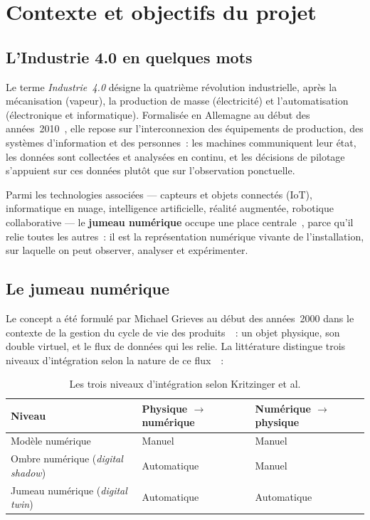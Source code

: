 \chapter{Contexte et objectifs du projet}
\label{chap:contexte}

\section{L'Industrie 4.0 en quelques mots}

Le terme \textit{Industrie~4.0} désigne la quatrième révolution industrielle, après la mécanisation (vapeur), la production de masse (électricité) et l'automatisation (électronique et informatique). Formalisée en Allemagne au début des années~2010~\cite{kagermann2013}, elle repose sur l'interconnexion des équipements de production, des systèmes d'information et des personnes~: les machines communiquent leur état, les données sont collectées et analysées en continu, et les décisions de pilotage s'appuient sur ces données plutôt que sur l'observation ponctuelle.

Parmi les technologies associées --- capteurs et objets connectés (\ac{IoT}), informatique en nuage, intelligence artificielle, réalité augmentée, robotique collaborative --- le \textbf{jumeau numérique} occupe une place centrale~\cite{tao2019}, parce qu'il relie toutes les autres~: il est la représentation numérique vivante de l'installation, sur laquelle on peut observer, analyser et expérimenter.

\section{Le jumeau numérique}

Le concept a été formulé par Michael Grieves au début des années~2000 dans le contexte de la gestion du cycle de vie des produits~\cite{grieves2014}~: un objet physique, son double virtuel, et le flux de données qui les relie. La littérature distingue trois niveaux d'intégration selon la nature de ce flux~\cite{kritzinger2018}~:

\begin{table}[H]
\centering
\caption{Les trois niveaux d'intégration selon Kritzinger et al.}
\label{tab:niveaux}
\begin{tabularx}{\textwidth}{@{}l X X@{}}
\toprule
\textbf{Niveau} & \textbf{Physique $\rightarrow$ numérique} & \textbf{Numérique $\rightarrow$ physique} \\
\midrule
Modèle numérique & Manuel & Manuel \\
Ombre numérique (\textit{digital shadow}) & Automatique & Manuel \\
Jumeau numérique (\textit{digital twin}) & Automatique & Automatique \\
\bottomrule
\end{tabularx}
\end{table}

